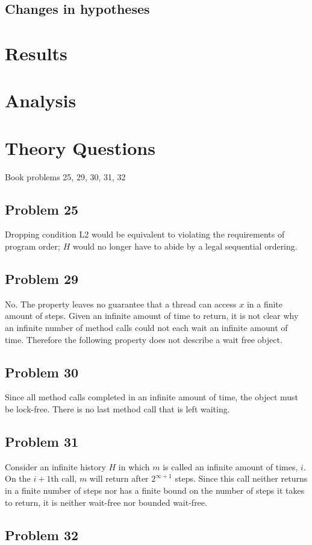 \documentclass[]{article}
\begin{document}
\subsection{Changes in hypotheses}

\section{Results}

\section{Analysis}


\section{Theory Questions}
Book problems 25, 29, 30, 31, 32

\subsection{Problem 25}
Dropping condition L2 would be equivalent to violating the requirements of program order; $H$ would no longer have to abide by a legal sequential ordering.

\subsection{Problem 29}
No. The property leaves no guarantee that a thread can access $x$ in a finite amount of steps. Given an infinite amount of time to return, it is not clear why an infinite number of method calls could not each wait an infinite amount of time. Therefore the following property does not describe a wait free object.

\subsection{Problem 30}
Since all method calls completed in an infinite amount of time, the object must be lock-free. There is no last method call that is left waiting.

\subsection{Problem 31}
Consider an infinite history $H$ in which $m$ is called an infinite amount of times, $i$. On the $i + 1$th call, $m$ will return after $2^{\infty + 1}$ steps. Since this call neither returns in a finite number of steps nor has a finite bound on the number of steps it takes to return, it is neither wait-free nor bounded wait-free.


\subsection{Problem 32}

	
	
\end{document}
